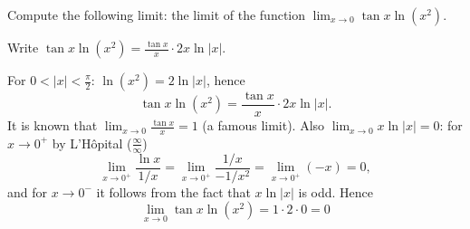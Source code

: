 
\begin{question}
Compute the following limit:
the limit of the function $\displaystyle\lim_{x\to0}\tan x\ln(x^2)$.
\end{question}

\begin{hint}
Write $\tan x\ln(x^2)=\frac{\tan x}{x}\cdot 2x\ln|x|$.
\end{hint}

\begin{solution}
For $0<|x|<\frac\pi2$: $\ln(x^2)=2\ln|x|$, hence
\[ \tan x\ln(x^2)=\frac{\tan x}{x}\cdot 2x\ln|x|. \]
It is known that $\lim_{x\to0}\frac{\tan x}{x}=1$ (a famous limit). Also $\lim_{x\to0}x\ln|x|=0$: for $x\to0^+$ by L'Hôpital ($\frac\infty\infty$)
\[ \lim_{x\to0^+}\frac{\ln x}{1/x}=\lim_{x\to0^+}\frac{1/x}{-1/x^2}=\lim_{x\to0^+}(-x)=0, \]
and for $x\to0^-$ it follows from the fact that $x\ln|x|$ is odd. Hence
\[ \boxed{\lim_{x\to0}\tan x\ln(x^2)=1\cdot2\cdot0=0} \]
\end{solution}
